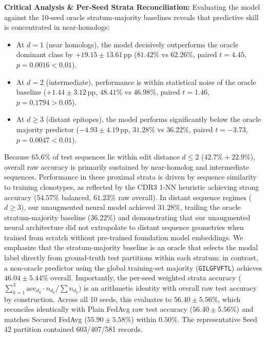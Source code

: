 \documentclass[11pt,a4paper]{report}
\begin{document}
\vspace{6pt}
\noindent\textbf{Critical Analysis \& Per-Seed Strata Reconciliation:} Evaluating the model against the 10-seed oracle stratum-majority baselines reveals that predictive skill is concentrated in near-homologs:
\begin{itemize}[itemsep=1pt]
  \item At $d=1$ (near homologs), the model decisively outperforms the oracle dominant class by $\mathbf{+19.15 \pm 13.61}$\,pp ($81.42\%$ vs $62.26\%$, paired $t = 4.45$, $p = 0.0016 < 0.01$).
  \item At $d=2$ (intermediate), performance is within statistical noise of the oracle baseline ($+1.44 \pm 3.12$\,pp, $48.41\%$ vs $46.98\%$, paired $t = 1.46$, $p = 0.1794 > 0.05$).
  \item At $d \ge 3$ (distant epitopes), the model performs significantly below the oracle majority predictor ($\mathbf{-4.93 \pm 4.19}$\,pp, $31.28\%$ vs $36.22\%$, paired $t = -3.73$, $p = 0.0047 < 0.01$).
\end{itemize}
Because $65.6\%$ of test sequences lie within edit distance $d \le 2$ ($42.7\% + 22.9\%$), overall raw accuracy is primarily sustained by near-homolog and intermediate sequences. Performance in these proximal strata is driven by sequence similarity to training clonotypes, as reflected by the CDR3 1-NN heuristic achieving strong accuracy ($54.57\%$ balanced, $61.23\%$ raw overall). In distant sequence regimes ($d \ge 3$), our unaugmented neural model achieved $31.28\%$, trailing the oracle stratum-majority baseline ($36.22\%$) and demonstrating that our unaugmented neural architecture did not extrapolate to distant sequence geometries when trained from scratch without pre-trained foundation model embeddings. We emphasize that the stratum-majority baseline is an oracle that selects the modal label directly from ground-truth test partitions within each stratum; in contrast, a non-oracle predictor using the global training-set majority (\lstinline|GILGFVFTL|) achieves $46.04 \pm 5.44\%$ overall. Importantly, the per-seed weighted strata accuracy ($\sum_{k=1}^3 \text{acc}_{d_k} \cdot n_{d_k} / \sum n_{d_k}$) is an arithmetic identity with overall raw test accuracy by construction. Across all 10 seeds, this evaluates to $\mathbf{56.40 \pm 5.56\%}$, which reconciles identically with Plain FedAvg raw test accuracy ($56.40 \pm 5.56\%$) and matches Secured FedAvg ($55.90 \pm 5.58\%$) within $0.50\%$. The representative Seed 42 partition contained 603/407/581 records.
\end{document}
